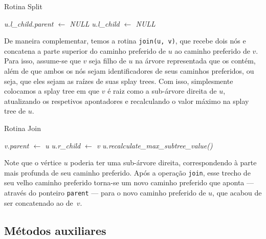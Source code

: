 \begin{algorithm}[h!]
    \caption{Rotina Split}\label{splay:split}
    \begin{algorithmic}
        \State \emph{u.l\_child.parent $\gets$ NULL}
        \EndIf
        \State \emph{u.l\_child $\gets$ NULL}
        \EndFunction
    \end{algorithmic}
\end{algorithm}

De maneira complementar, temos a rotina \texttt{join(u, v)}, que recebe dois nós e concatena a parte superior do caminho preferido de $u$ ao caminho preferido de $v$. Para isso, assume-se que $v$ seja filho de $u$ na árvore representada que os contém, além de que ambos os nós sejam identificadores de seus caminhos preferidos, ou seja, que eles sejam as raízes de suas splay trees. Com isso, simplesmente colocamos a splay tree em que $v$ é raiz como a sub-árvore direita de $u$, atualizando os respetivos apontadores e recalculando o valor máximo na splay tree de $u$.

\begin{algorithm}[h!]
    \caption{Rotina Join}\label{splay:join}
    \begin{algorithmic}
        \State \emph{v.parent $\gets$ u}
        \EndIf
        \State \emph{u.r\_child $\gets$ v}
        \State {}
        \State \emph{u.recalculate\_max\_subtree\_value()}
        \EndFunction
    \end{algorithmic}
\end{algorithm}

Note que o vértice $u$ poderia ter uma sub-árvore direita, correspondendo à parte mais profunda de seu caminho preferido. Após a operação \texttt{join}, esse trecho de seu velho caminho preferido torna-se um novo caminho preferido que aponta --- através do ponteiro \texttt{parent} --- para o novo caminho preferido de $u$, que acabou de ser concatenado ao de~$v$.

\subsection{Métodos auxiliares}
\label{subsection:lct-splay-aux}

